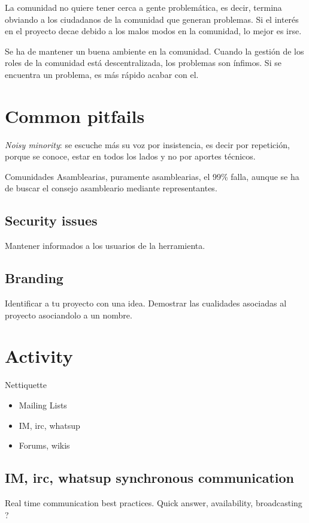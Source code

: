 \documentclass[11pt]{scrartcl}
\begin{document}
\par La comunidad no quiere tener cerca a gente problemática, es decir, termina obviando a los ciudadanos de la comunidad que generan problemas. Si el interés en el proyecto decae debido a los malos modos en la comunidad, lo mejor es irse.

\par Se ha de mantener un buena ambiente en la comunidad. Cuando la gestión de los roles de la comunidad está descentralizada, los problemas son ínfimos. Si se encuentra un problema, es más rápido acabar con el.

\section{Common pitfails}
\label{sec:}

\emph{Noisy minority}: se escuche más su voz por insistencia, es decir por repetición, porque se conoce, estar en todos los lados y no por aportes técnicos.

\par Comunidades Asamblearias, puramente asamblearias, el 99\% falla, aunque se ha de buscar el consejo asambleario mediante representantes.


\subsection{Security issues}
\label{sec:sec-issues}

Mantener informados a los usuarios de la herramienta.


\subsection{Branding}
\label{sub:branding}

Identificar a tu proyecto con una idea. Demostrar las cualidades asociadas al proyecto asociandolo a un nombre.


\section{Activity}
\label{sec:activity}

Nettiquette 

\begin{itemize}
	\item Mailing Lists
	\item IM, irc, whatsup
	\item Forums, wikis
\end{itemize}

\subsection{IM, irc, whatsup synchronous communication}
\label{sub:im}

Real time communication best practices.
Quick answer, availability, broadcasting ? 

\end{document}
